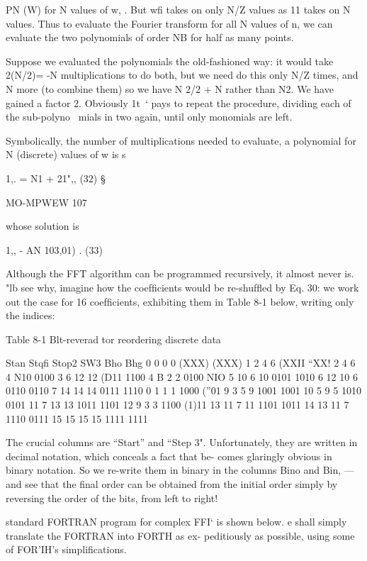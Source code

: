 PN (W) for N values of w, . But wﬁ takes on only N/Z values as 11
takes on N values. Thus to evaluate the Fourier transform for all
N values of n, we can evaluate the two polynomials of order NB
for half as many points.

Suppose we evaluated the polynomials the old-fashioned way: it
would take 2(N/2)= -N multiplications to do both, but we need do
this only N/Z times, and N more (to combine them) so we have
N 2/2 + N rather than N2. We have gained a factor 2. Obviously 1t~‘
pays to repeat the procedure, dividing each of the sub-polyno~
mials in two again, until only monomials are left.

Symbolically, the number of multiplications needed to evaluate,
a polynomial for N (discrete) values of w is s

1,. = N1 + 21",, (32) §

 

MO-MPWEW 107

whose solution is

1,, - AN 103,01) . (33)

Although the FFT algorithm can be programmed recursively, it
almost never is. "lb see why, imagine how the coefﬁcients would
be re-shufﬂed by Eq. 30: we work out the case for 16 coefﬁcients,
exhibiting them in Table 8-1 below, writing only the indices:

Table 8-1 Blt-reverad tor reordering discrete data

 

Stan Stqﬁ Stop2 SW3 Bho Bhg
0 0 0 0 (XXX) (XXX)
1 2 4 6 (XXII “XX!
2 4 6 4 N10 0100
3 6 12 12 (D11 1100
4 B 2 2 0100 NIO
5 10 6 10 0101 1010
6 12 10 6 0110 0110
7 14 14 14 0111 1110
0 1 1 1 1000 (”01
9 3 5 9 1001 1001
10 5 9 5 1010 0101
11 7 13 13 1011 1101
12 9 3 3 1100 (1)11
13 11 7 11 1101 1011
14 13 11 7 1110 0111
15 15 15 15 1111 1111

 

 

The crucial columns are “Start” and “Step 3". Unfortunately, they
are written in decimal notation, which conceals a fact that be-
comes glaringly obvious in binary notation. So we re-write them
in binary in the columns Bino and Bin, —and see that the ﬁnal
order can be obtained from the initial order simply by reversing
the order of the bits, from left to right!

standard FORTRAN program for complex FFI‘ is shown below.
e shall simply translate the FORTRAN into FORTH as ex-
peditiously as possible, using some of FOR'IH's simpliﬁcations.

